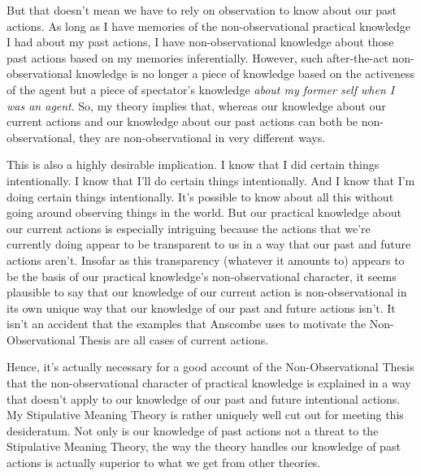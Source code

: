 \documentclass[a4paper,12pt]{article}
\begin{document}
But that doesn't mean we have to rely on observation to know about our past actions. As long as I have memories of the non-observational practical knowledge I had about my past actions, I have non-observational knowledge about those past actions based on my memories inferentially. However, such after-the-act non-observational knowledge is no longer a piece of knowledge based on the activeness of the agent but a piece of spectator's knowledge \emph{about my former self when I was an agent}. So, my theory implies that, whereas our knowledge about our current actions and our knowledge about our past actions can both be non-observational, they are non-observational in very different ways.

This is also a highly desirable implication. I know that I did certain things intentionally. I know that I'll do certain things intentionally. And I know that I'm doing certain things intentionally. It's possible to know about all this without going around observing things in the world. But our practical knowledge about our current actions is especially intriguing because the actions that we're currently doing appear to be transparent to us in a way that our past and future actions aren't. Insofar as this transparency (whatever it amounts to) appears to be the basis of our practical knowledge's non-observational character, it seems plausible to say that our knowledge of our current action is non-observational in its own unique way that our knowledge of our past and future actions isn't. It isn't an accident that the examples that Anscombe uses to motivate the Non-Observational Thesis are all cases of current actions.

Hence, it's actually necessary for a good account of the Non-Observational Thesis that the non-observational character of practical knowledge is explained in a way that doesn't apply to our knowledge of our past and future intentional actions. My Stipulative Meaning Theory is rather uniquely well cut out for meeting this desideratum. Not only is our knowledge of past actions not a threat to the Stipulative Meaning Theory, the way the theory handles our knowledge of past actions is actually superior to what we get from other theories.

\nocite{*}


\end{document}

